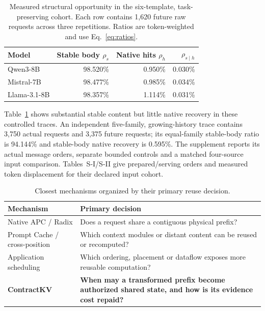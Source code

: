 \begin{table}[t]
\centering\small
\caption{Measured structural opportunity in the six-template, task-preserving cohort. Each row contains 1,620 future raw requests across three repetitions. Ratios are token-weighted and use Eq.~\eqref{eq:ratios}.}
\label{tab:motivation}
\begin{tabular}{@{}lrrr@{}}
\toprule
Model & Stable body $\rho_s$ & Native hits $\rho_h$ & $\rho_{s\mid h}$\\
\midrule
Qwen3-8B & 98.520\% & 0.950\% & 0.030\%\\
Mistral-7B & 98.477\% & 0.985\% & 0.034\%\\
Llama-3.1-8B & 98.357\% & 1.114\% & 0.031\%\\
\bottomrule
\end{tabular}
\end{table}

Table~\ref{tab:motivation} shows substantial stable content but little native recovery in these controlled traces. An independent five-family, growing-history trace contains 3,750 actual requests and 3,375 future requests; its equal-family stable-body ratio is 94.144\% and stable-body native recovery is 0.595\%. The supplement reports its actual message orders, separate bounded controls and a matched four-source input comparison. Tables~S-I/S-II give prepared/serving orders and measured token displacement for their declared input cohort.

\begin{table}[t]
\centering\footnotesize
\setlength{\tabcolsep}{3pt}
\caption{Closest mechanisms organized by their primary reuse decision.}
\label{tab:closest-work}
\begin{tabular}{@{}P{.83in}P{2.39in}@{}}
\toprule
Mechanism & Primary decision\\
\midrule
Native APC / Radix & Does a request share a contiguous physical prefix?~\cite{vllm2023,sglang2024}\\
Prompt Cache / cross-position & Which context modules or distant content can be reused or recomputed?~\cite{promptcache2024,cacheblend2025,epic2025}\\
Application scheduling & Which ordering, placement or dataflow exposes more reusable computation?~\cite{parrot2024,llmqueries2025}\\
\textbf{ContractKV} & \textbf{When may a transformed prefix become authorized shared state, and how is its evidence cost repaid?}\\
\bottomrule
\end{tabular}
\end{table}

